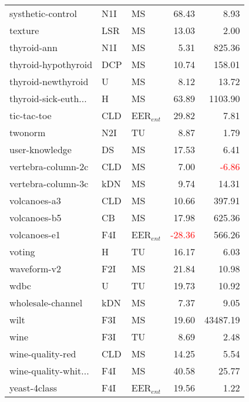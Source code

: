 \begin{tabular}{lllrr}
systhetic-control & N1I & MS & 68.43 & 8.93 \\
texture & LSR & MS & 13.03 & 2.00 \\
thyroid-ann & N1I & MS & 5.31 & 825.36 \\
thyroid-hypothyroid & DCP & MS & 10.74 & 158.01 \\
thyroid-newthyroid & U & MS & 8.12 & 13.72 \\
thyroid-sick-euth... & H & MS & 63.89 & 1103.90 \\
tic-tac-toe & CLD & EER$_{ent}$ & 29.82 & 7.81 \\
twonorm & N2I & TU & 8.87 & 1.79 \\
user-knowledge & DS & MS & 17.53 & 6.41 \\
vertebra-column-2c & CLD & MS & 7.00 & \textcolor{red}{-6.86} \\
vertebra-column-3c & kDN & MS & 9.74 & 14.31 \\
volcanoes-a3 & CLD & MS & 10.66 & 397.91 \\
volcanoes-b5 & CB & MS & 17.98 & 625.36 \\
volcanoes-e1 & F4I & EER$_{ent}$ & \textcolor{red}{-28.36} & 566.26 \\
voting & H & TU & 16.17 & 6.03 \\
waveform-v2 & F2I & MS & 21.84 & 10.98 \\
wdbc & U & TU & 19.73 & 10.92 \\
wholesale-channel & kDN & MS & 7.37 & 9.05 \\
wilt & F3I & MS & 19.60 & 43487.19 \\
wine & F3I & TU & 8.69 & 2.48 \\
wine-quality-red & CLD & MS & 14.25 & 5.54 \\
wine-quality-whit... & F4I & MS & 40.58 & 25.77 \\
yeast-4class & F4I & EER$_{ent}$ & 19.56 & 1.22 \\
\bottomrule
\end{tabular}
